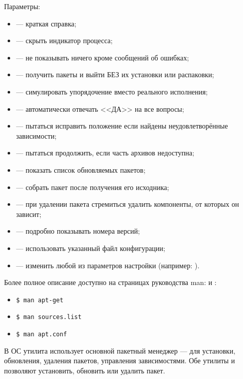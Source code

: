 Параметры:
\begin{itemize}
	\item {} --- краткая справка;
	\item {} --- скрыть индикатор процесса;
	\item {}--- не показывать ничего кроме сообщений об ошибках;
	\item {} --- получить пакеты и выйти БЕЗ их установки или распаковки;
	\item {} --- симулировать упорядочение вместо реального исполнения;
	\item {} --- автоматически отвечать <<ДА>> на все вопросы;
	\item {} --- пытаться исправить положение если найдены неудовлетворённые зависимости;
	\item {} --- пытаться продолжить, если часть архивов недоступна;
	\item {} --- показать список обновляемых пакетов;
	\item {} --- собрать пакет после получения его исходника;
	\item {} --- при удалении пакета стремиться удалить компоненты, от которых он зависит;
	\item {} --- подробно показывать номера версий;
	\item {} --- использовать указанный файл конфигурации;
	\item {} --- изменить любой из параметров настройки (например: ).
\end{itemize}

Более полное описание доступно на страницах руководства man:
 и :
\begin{itemize}
	\item\begin{verbatim}$ man apt-get\end{verbatim}
	\item\begin{verbatim}$ man sources.list\end{verbatim}
	\item\begin{verbatim}$ man apt.conf\end{verbatim}
\end{itemize}

В ОС  утилита  использует основной пакетный менеджер  ---
 для установки, обновления, удаления пакетов, управления зависимостями. Обе
утилиты  и  позволяют установить, обновить или удалить пакет.

